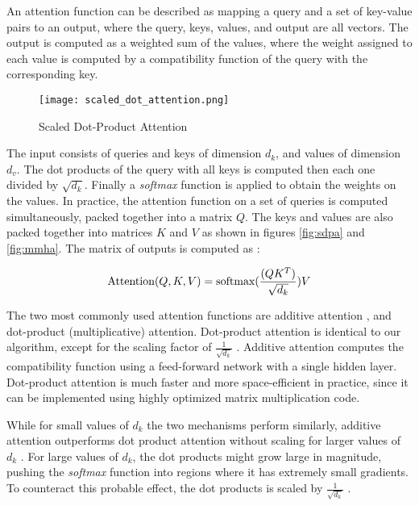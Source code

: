 \hspace{0.5cm} An attention function can be described as mapping a query and a set of key-value pairs to an output, where the query, keys, values, and output are all vectors. The output is computed as a weighted sum of the values, where the weight assigned to each value is computed by a compatibility function of the query with the corresponding key.

\begin{figure}[!htbp]
    \centering
    \texttt{[image: scaled\_dot\_attention.png]}
    \caption[Scaled Dot-Product Attention]{Scaled Dot-Product Attention \cite{2017arXiv170603762V}}
    \label{fig:sdpa}
\end{figure}

The input consists of queries and keys of dimension $d_k$, and values of dimension $d_v$. The dot products of the query with all keys is computed then each one divided by $\sqrt{d_k}$. Finally a \emph{softmax} function is applied to obtain the weights on the values. In practice, the attention function on a set of queries is computed simultaneously, packed together into a matrix $Q$. The keys and values are also packed together into matrices $K$ and $V$ as shown in figures \eqref{fig:sdpa} and \eqref{fig:mmha}. The matrix of outputs is computed as \cite{2017arXiv170603762V}:

\[\textnormal{Attention}(Q, K, V) = \textnormal{softmax}(\frac{(Q K^T)}{\sqrt{d_k}})V\]

The two most commonly used attention functions are additive attention \cite{2014arXiv14090473B}, and dot-product (multiplicative) attention. Dot-product attention is identical to our algorithm, except for the scaling factor of $\frac{1}{\sqrt{d_k}}$ . Additive attention computes the compatibility function using a feed-forward network with a single hidden layer. Dot-product attention is much faster and more space-efficient in practice, since it can be implemented using highly optimized matrix multiplication code.

While for small values of $d_k$ the two mechanisms perform similarly, additive attention outperforms
dot product attention without scaling for larger values of $d_k$ \cite{2017arXiv170303906B}. For large values of $d_k$, the dot products might grow large in magnitude, pushing the \emph{softmax} function into regions where it has extremely small gradients. To counteract this probable effect, the dot products is scaled by $\frac{1}{\sqrt{d_k}}$ \cite{2017arXiv170603762V}.

